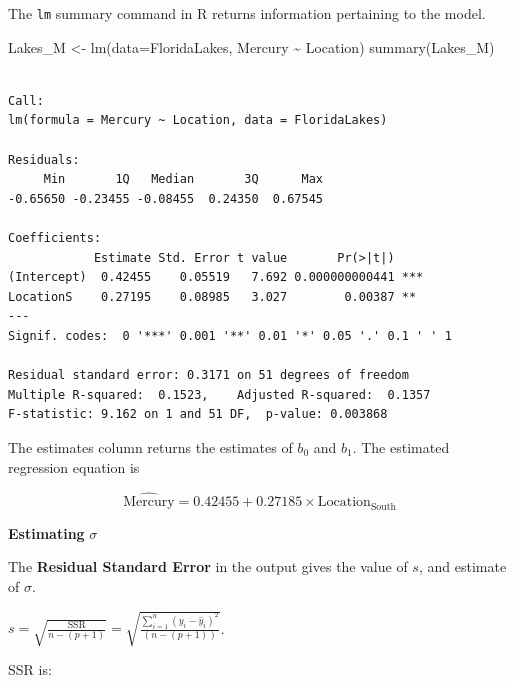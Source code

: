 \documentclass[
  letterpaper,
  DIV=11,
  numbers=noendperiod]{scrreprt}
\newenvironment{Shaded}{\begin{snugshade}}{\end{snugshade}}
\newcommand{\AttributeTok}[1]{\textcolor[rgb]{0.40,0.45,0.13}{#1}}
\newcommand{\DecValTok}[1]{\textcolor[rgb]{0.68,0.00,0.00}{#1}}
\newcommand{\FunctionTok}[1]{\textcolor[rgb]{0.28,0.35,0.67}{#1}}
\newcommand{\NormalTok}[1]{\textcolor[rgb]{0.00,0.23,0.31}{#1}}
\newcommand{\OtherTok}[1]{\textcolor[rgb]{0.00,0.23,0.31}{#1}}
\newcommand{\SpecialCharTok}[1]{\textcolor[rgb]{0.37,0.37,0.37}{#1}}
\begin{document}
The \texttt{lm} summary command in R returns information pertaining to
the model.

\begin{Shaded}
\begin{Highlighting}[]
\NormalTok{Lakes\_M }\OtherTok{\textless{}{-}} \FunctionTok{lm}\NormalTok{(}\AttributeTok{data=}\NormalTok{FloridaLakes, Mercury }\SpecialCharTok{\textasciitilde{}}\NormalTok{ Location)}
\FunctionTok{summary}\NormalTok{(Lakes\_M)}
\end{Highlighting}
\end{Shaded}

\begin{verbatim}

Call:
lm(formula = Mercury ~ Location, data = FloridaLakes)

Residuals:
     Min       1Q   Median       3Q      Max 
-0.65650 -0.23455 -0.08455  0.24350  0.67545 

Coefficients:
            Estimate Std. Error t value       Pr(>|t|)    
(Intercept)  0.42455    0.05519   7.692 0.000000000441 ***
LocationS    0.27195    0.08985   3.027        0.00387 ** 
---
Signif. codes:  0 '***' 0.001 '**' 0.01 '*' 0.05 '.' 0.1 ' ' 1

Residual standard error: 0.3171 on 51 degrees of freedom
Multiple R-squared:  0.1523,    Adjusted R-squared:  0.1357 
F-statistic: 9.162 on 1 and 51 DF,  p-value: 0.003868
\end{verbatim}

The estimates column returns the estimates of \(b_0\) and \(b_1\). The
estimated regression equation is

\[
\widehat{\text{Mercury}} = 0.42455 + 0.27185\times\text{Location}_{\text{South}}
\]

\textbf{Estimating} \(\sigma\)

The \textbf{Residual Standard Error} in the output gives the value of
\(s\), and estimate of \(\sigma\).

\(s =\sqrt{\frac{\text{SSR}}{n-(p+1)}} = \sqrt{\frac{\displaystyle\sum_{i=1}^n(y_i-\hat{y}_i)^2}{(n-(p+1))}}\).

SSR is:

\begin{Shaded}
\end{Shaded}
\end{document}
